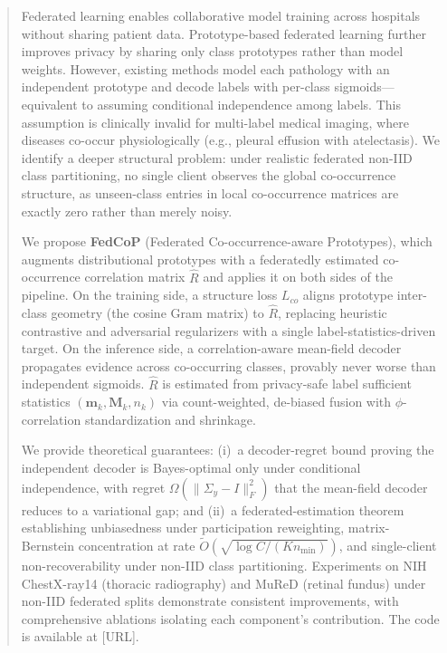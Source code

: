 \documentclass[conference]{IEEEtran}
\theoremstyle{definition}
\newcommand{\Rhat}{\widehat{R}}
\newcommand{\Sigmay}{\Sigma_{y}}
\begin{document}
\begin{abstract}
Federated learning enables collaborative model training across hospitals without sharing patient data. Prototype-based federated learning further improves privacy by sharing only class prototypes rather than model weights. However, existing methods model each pathology with an independent prototype and decode labels with per-class sigmoids---equivalent to assuming conditional independence among labels. This assumption is clinically invalid for multi-label medical imaging, where diseases co-occur physiologically (e.g., pleural effusion with atelectasis). We identify a deeper structural problem: under realistic federated non-IID class partitioning, no single client observes the global co-occurrence structure, as unseen-class entries in local co-occurrence matrices are exactly zero rather than merely noisy.

We propose \textbf{FedCoP} (Federated Co-occurrence-aware Prototypes), which augments distributional prototypes with a federatedly estimated co-occurrence correlation matrix $\Rhat$ and applies it on both sides of the pipeline. On the training side, a structure loss $L_{co}$ aligns prototype inter-class geometry (the cosine Gram matrix) to $\Rhat$, replacing heuristic contrastive and adversarial regularizers with a single label-statistics-driven target. On the inference side, a correlation-aware mean-field decoder propagates evidence across co-occurring classes, provably never worse than independent sigmoids. $\Rhat$ is estimated from privacy-safe label sufficient statistics $(\mathbf{m}_k,\mathbf{M}_k,n_k)$ via count-weighted, de-biased fusion with $\phi$-correlation standardization and shrinkage.

We provide theoretical guarantees: (i)~a decoder-regret bound proving the independent decoder is Bayes-optimal only under conditional independence, with regret $\Omega(\|\Sigmay-I\|_F^{2})$ that the mean-field decoder reduces to a variational gap; and (ii)~a federated-estimation theorem establishing unbiasedness under participation reweighting, matrix-Bernstein concentration at rate $\tilde O(\sqrt{\log C/(K n_{\min})})$, and single-client non-recoverability under non-IID class partitioning. Experiments on NIH ChestX-ray14 (thoracic radiography) and MuReD (retinal fundus) under non-IID federated splits demonstrate consistent improvements, with comprehensive ablations isolating each component's contribution. The code is available at [URL].
\end{abstract}
\end{document}
